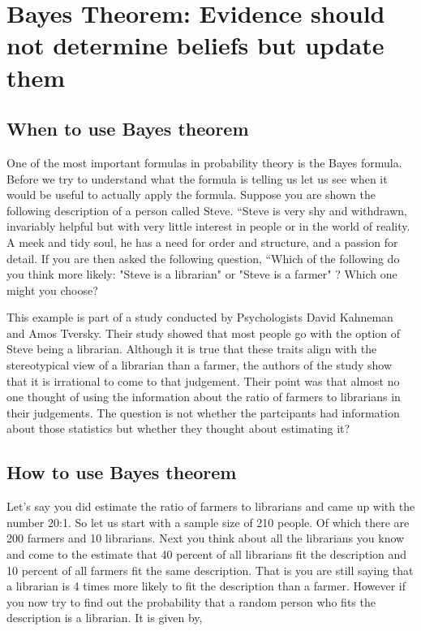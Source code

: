 \documentclass{../template/texnote}
\begin{document}
\section{Bayes Theorem: Evidence should not determine beliefs but update them}
\subsection{When to use Bayes theorem}
One of the most important formulas in probability theory is the Bayes formula.
Before we try to understand what the formula is telling us let us see when it would be useful to actually apply the formula.
Suppose you are shown the following description of a person called Steve.
``Steve is very shy and withdrawn, invariably helpful but with very little interest in people or in the world of reality.
A meek and tidy soul, he has a need for order and structure, and a passion for detail.
If you are then asked the following question, ``Which of the following do you think more likely: "Steve is a librarian" or "Steve is a farmer" ? 
Which one might you choose?

This example is part of a study conducted by Psychologists David Kahneman and Amos Tversky.
Their study showed that most people go with the option of Steve being a librarian.
Although it is true that these traits align with the stereotypical view of a librarian than a farmer, the authors of the study show that it is irrational to come to that judgement.
Their point was that almost no one thought of using the information about the ratio of farmers to librarians in their judgements.
The question is not whether the partcipants had information about those statistics but whether they thought about estimating it?

\subsection{How to use Bayes theorem}
Let's say you did estimate the ratio of farmers to librarians and came up with the number 20:1. 
So let us start with a sample size of 210 people. Of which there are 200 farmers and 10 librarians.
Next you think about all the librarians you know and come to the estimate that 40 percent of all librarians fit the description and 10 percent of all farmers fit the same description. That is you are still saying that a librarian is 4 times more likely to fit the description than a farmer.
However if you now try to find out the probability that a random person who fits the description is a librarian. It is given by, 
\end{document}
